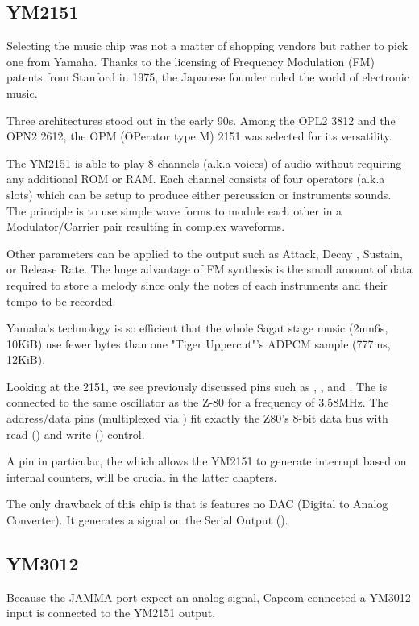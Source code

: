 \subsection{YM2151}
Selecting the music chip was not a matter of shopping vendors but rather to pick one from Yamaha. Thanks to the licensing of Frequency Modulation (FM) patents from Stanford in 1975, the Japanese founder ruled the world of electronic music.

Three architectures stood out in the early 90s. Among the OPL2 3812 and the OPN2 2612, the OPM (OPerator type M) 2151 was selected for its versatility. 

The YM2151 is able to play 8 channels (a.k.a voices) of audio without requiring any additional ROM or RAM. Each channel consists of four operators (a.k.a slots) which can be setup to produce either percussion or instruments sounds. The principle is to use simple wave forms to module each other in a Modulator/Carrier pair resulting in complex waveforms\cite{fmProgramming}.


Other parameters can be applied to the output such as Attack, Decay , Sustain, or Release Rate. The huge advantage of FM synthesis is the small amount of data required to store a melody since only the notes of each instruments and their tempo to be recorded. 

Yamaha's technology is so efficient that the whole Sagat stage music (2mn6s, 10KiB) use fewer bytes than one "Tiger Uppercut"'s ADPCM sample (777ms, 12KiB).

Looking at the 2151, we see previously discussed pins such as , , and . The  is connected to the same oscillator as the Z-80 for a frequency of 3.58MHz. The  address/data pins (multiplexed via ) fit exactly the Z80's 8-bit data bus with read () and write () control.

A pin in particular, the  which allows the YM2151 to generate interrupt based on internal counters, will be crucial in the latter chapters.


The only drawback of this chip is that is features no DAC (Digital to Analog Converter). It generates a signal on the Serial Output (). 

\subsection{YM3012}
Because the JAMMA port expect an analog signal, Capcom connected a YM3012 input is connected to the YM2151 output. 


